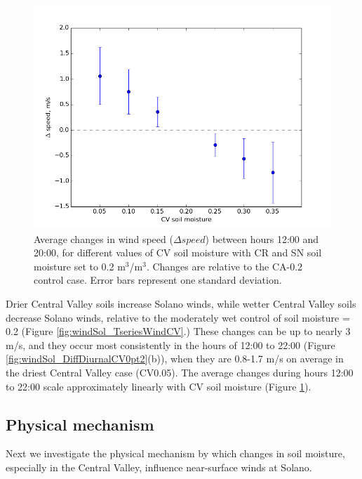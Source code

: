 \begin{figure}[here]
\includegraphics[width=1\textwidth]{ch3-wind/img/shifts_CVsmois_12-20_d02.png}
\caption{Average changes in wind speed ($\Delta speed$) between hours 12:00 and 20:00, for different values of CV soil moisture with CR and SN soil moisture set to 0.2 m$^3$/m$^3$.  Changes are relative to the CA-0.2 control case.  Error bars represent one standard deviation.}
\label{fig:windSol_ShiftsMaxCV}
\end{figure}

Drier Central Valley soils increase Solano winds, while wetter Central Valley soils decrease Solano winds, relative to the moderately wet control of soil moisture = 0.2 (Figure \ref{fig:windSol_TseriesWindCV}.)  These changes can be up to nearly 3 m/s, and they occur most consistently in the hours of 12:00 to 22:00 (Figure \ref{fig:windSol_DiffDiurnalCV0pt2}(b)), when they are 0.8-1.7 m/s on average in the driest Central Valley case (CV0.05).  The average changes during hours 12:00 to 22:00 scale approximately linearly with CV soil moisture (Figure \ref{fig:windSol_ShiftsMaxCV}).


\subsection{Physical mechanism}
\label{subsec:PhysMech}

Next we investigate the physical mechanism by which changes in soil moisture, especially in the Central Valley, influence near-surface winds at Solano.  

